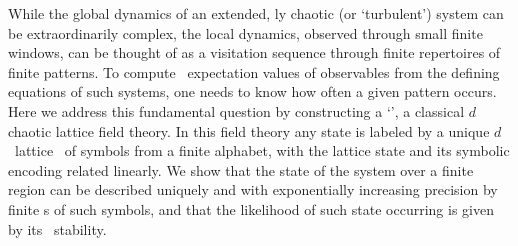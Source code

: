 

While the global dynamics of an extended, {\spt}ly chaotic (or
`turbulent') system can be extraordinarily complex, the local dynamics,
observed through small {\spt} finite windows, can be thought of as a
visitation sequence through finite repertoires of finite patterns.
To compute \spt\ expectation values of observables from the defining
equations of such systems,  one needs to know how often a given pattern
occurs.
Here we address this fundamental question by constructing a
`\catlatt', a classical $d$\dmn\ {\spt} chaotic lattice field theory.
In this field theory any {\spt} state is labeled by a unique $d$\dmn\
lattice \brick\ of symbols from a finite alphabet, with the lattice
state and its symbolic encoding related linearly.
We show that the state of the system over a finite {\spt} region can be
described uniquely and with exponentially increasing precision by finite
\brick s of such symbols, and that the likelihood of such state
occurring is given by its \spt\ stability.
